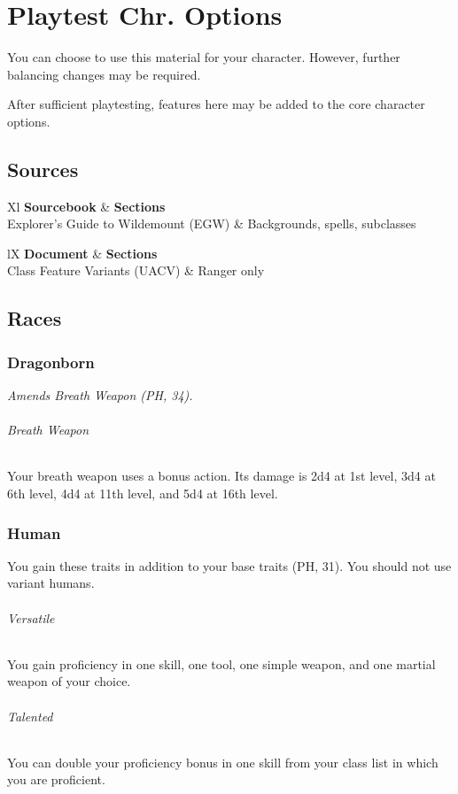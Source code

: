 \documentclass[House_Rules.tex]{subfiles}
\begin{document}
\chapter{Playtest Chr. Options}

You can choose to use this material for your character. However, further balancing changes may be required. 

After sufficient playtesting, features here may be added to the core character options.




\section{Sources}

\begin{DndTable}[]{Xl}
    \textbf{Sourcebook} & \textbf{Sections} \\
    Explorer's Guide to Wildemount (EGW) & Backgrounds, spells, subclasses \\
\end{DndTable}

\begin{DndTable}[header=Unearthed Arcana]{lX}
    \textbf{Document} & \textbf{Sections} \\
    Class Feature Variants (UACV) & Ranger only \\
\end{DndTable}




\section{Races}

\subsection{Dragonborn}
\textit{Amends Breath Weapon (PH, 34).}

\subparagraph{Breath Weapon} Your breath weapon uses a bonus action. Its damage is 2d4 at 1st level, 3d4 at 6th level, 4d4 at 11th level, and 5d4 at 16th level.

\subsection{Human}

You gain these traits in addition to your base traits (PH, 31). You should not use variant humans.

\subparagraph{Versatile} You gain proficiency in one skill, one tool, one simple weapon, and one martial weapon of your choice.
\subparagraph{Talented} You can double your proficiency bonus in one skill from your class list in which you are proficient.
\end{document}
